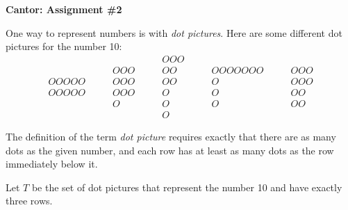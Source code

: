 \documentclass[12pt,letterpaper]{article}
\begin{document}
\setlength{\parskip}{1ex plus 0.5ex minus 0.2ex}
\setlength{\parindent}{0pt}

\pagestyle{fancy}
\lfoot{}
\rfoot{}

\begin{center}
{
\Large
\textbf{Cantor: Assignment \#2}
}
\end{center}

One way to represent numbers is with \emph{dot pictures}.
Here are some different dot pictures for the number 10:
\[
\begin{array}{l}
OOOOO\\ OOOOO
\end{array}
\qquad
\begin{array}{l} OOO\\ OOO \\ OOO \\ O\end{array}
\qquad\begin{array} {l} OOO\\ OO\\ OO\\ O\\ O\\ O\end{array}
\qquad\begin{array}{l} OOOOOOO\\ O \\ O \\ O\end{array}
\qquad\begin{array}{l} OOO\\ OOO\\ OO\\ OO\end{array}
\]

The definition of the term \emph{dot picture} requires exactly that there are as many dots as the given number, and each row has at least as many dots as the row immediately below it.

Let $T$ be the set of dot pictures that represent the number 10 and have exactly three rows.
\end{document}
